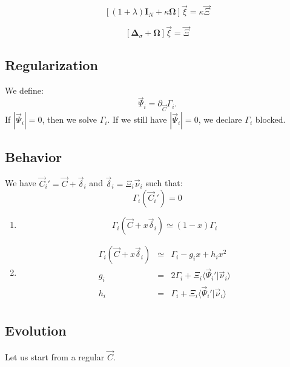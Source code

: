 \documentclass[aps,12pt]{revtex4}
\begin{document}
\begin{equation}
	\left[ (1+\lambda) \bm{I}_N + \kappa \bm{\Omega} \right] \vec{\xi} = \kappa \vec{\Xi}
\end{equation}

\begin{equation}
	\left[ \bm{\Delta}_\sigma + \bm{\Omega} \right] \vec{\xi} = \vec{\Xi}
\end{equation}


\subsection{Regularization}
We define:
\begin{equation}
\vec{\Psi}_i = \partial_{\vec{C}} \Gamma_i.
\end{equation}
If $|\vec{\Psi}_i|=0$, then we solve $\Gamma_i$. If we still have $|\vec{\Psi}_i|=0$, we declare $\Gamma_i$ blocked.

\subsection{Behavior}
We have $\vec{C}_i'=\vec{C} + \vec{\delta}_i$ and $\vec{\delta}_i = \Xi_i \vec{\nu}_i$ such that:
\begin{equation}
	\Gamma_i(\vec{C}_i') = 0
\end{equation}

\begin{enumerate}
\item
\begin{equation}
	\Gamma_i(\vec{C} + x \vec{\delta}_i) \simeq (1-x) \Gamma_i
\end{equation}

\item
\begin{equation}
\begin{array}{rcl}
	\Gamma_i(\vec{C} + x  \vec{\delta}_i) & \simeq & \Gamma_i -g_i x + h_i x^2\\
	g_i & = & 2\Gamma_i + \Xi_i \langle\vec{\Psi}_i'  \vert \vec{\nu}_i \rangle\\
	h_i & = & \Gamma_i + \Xi_i \langle\vec{\Psi}_i'  \vert \vec{\nu}_i \rangle\\
\end{array}
\end{equation}

\end{enumerate}
 

 
\subsection{Evolution}
Let us start from a regular $\vec{C}$.
\end{document}
